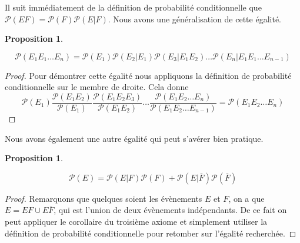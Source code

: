 \documentclass[a4paper,12pt]{report}
\theoremstyle{definition}
\renewcommand{\(}{\left(}
\renewcommand{\)}{\right)}
\renewcommand{\P}{\mathcal{P}}
\renewcommand{\bar}{\overline}
\newtheorem{prop}[thm]{Proposition}
\begin{document}
    Il suit immédiatement de la définition de probabilité conditionnelle que $\P(EF) = \P(F)\P(E|F)$. Nous avons une généralisation de cette égalité.
    
    \begin{prop}
    \begin{leftbar}
        $$\P(E_1E_1\ldots E_n) = \P(E_1)\P(E_2|E_1)\P(E_3|E_1E_2) \ldots \P(E_n|E_1E_1\ldots E_{n-1})  $$
    \end{leftbar}
    \end{prop}
    
    \begin{proof}
        Pour démontrer cette égalité nous appliquons la définition de probabilité conditionnelle sur le membre de droite. Cela donne
        $$\P(E_1) \frac{\P(E_1E_2)}{\P(E_1)}\frac{\P(E_1E_2E_3)}{\P(E_1E_2)}\ldots\frac{\P(E_1E_2\ldots E_n)}{\P(E_1E_2\ldots E_{n-1})} = \P(E_1E_2\ldots E_n)$$
    \end{proof}
    
    Nous avons également une autre égalité qui peut s'avérer bien pratique.
    \begin{prop}
    \begin{leftbar}
        $$\P(E) = \P(E|F)\P(F) + \P(E|\bar{F})\P(\bar{F})$$
    \end{leftbar}
    \end{prop}
    
    \begin{proof}
        Remarquons que quelques soient les évènements $E$ et $F$, on a que $ E= EF \cup E\bar{F}$, qui est l'union de deux évènements indépendants. De ce fait on peut appliquer le corollaire du troisième axiome et simplement utiliser la définition de probabilité conditionnelle pour retomber sur l'égalité recherchée.
    \end{proof}
    
\end{document}
